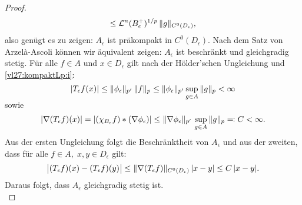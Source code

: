 \begin{proof}
\[        \leq \leb^n(B^+_\epsilon)^{1/p} \,
        \norm{g}_{C^0(D_\epsilon)}
    , \]
    also genügt es zu zeigen:
    $A_\epsilon$ ist präkompakt in $C^0(D_\epsilon)$.
    Nach dem Satz von Arzel\`a-Ascoli 
    können wir äquivalent zeigen: $A_\epsilon$ ist beschränkt und
    gleichgradig stetig. Für alle $f\in A$ und $x\in D_\epsilon$
    gilt nach der Hölder'schen Ungleichung und \ref{vl27:kompaktLp:i}:
    \[ \abs{T_\epsilon f(x)}
        \leq \norm{\phi_\epsilon}_{p'} \, \norm{f}_p
        \leq \norm{\phi_\epsilon}_{p'} \, \smash{\sup_{g\in A}}\, \norm{g}_p
        < \infty
    \]
    sowie
    \[ \abs*{\nabla(T_\epsilon f)(x)}
        =\abs*{(\chi_{B_\epsilon}f)\ast(\nabla\phi_\epsilon)}
        \leq \norm{\nabla\phi_\epsilon}_{p'} \,
            \sup_{g\in A}\, \norm{g}_p \eqdef C < \infty
    . \]
    Aus der ersten Ungleichung folgt die Beschränktheit von $A_\epsilon$
    und aus der zweiten, dass für alle $f\in A,\; x,y\in D_\epsilon$ gilt:
    \[ \abs[\big]{ (T_\epsilon f)(x) - (T_\epsilon f)(y) }
        \leq \norm{\nabla(T_\epsilon f)}_{C^0(D_\epsilon)} \, \abs{x-y}
        \leq C \, \abs{x-y}
    . \]
    Daraus folgt, dass $A_\epsilon$ gleichgradig stetig ist.
    \\
\end{proof}
